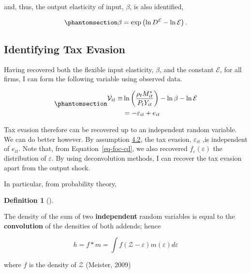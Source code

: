 \documentclass[
  12pt]{article}
\theoremstyle{definition}
\newtheorem{definition}{Definition}[section]
\theoremstyle{remark}
\newenvironment{fbx}[3]{\begin{tcolorbox}[enhanced, breakable,%
attach boxed title to top*={xshift=1.4pt},
boxed title style={boxrule=0.0mm, fuzzy shadow={1pt}{-1pt}{0mm}{0.1mm}{gray}, arc=.3em, rounded corners=east, sharp corners=west}, colframe=#1-color2, colbacktitle=#1-color1, colback = white, coltitle=black,  titlerule=0mm, toprule=0pt, bottomrule=.7pt, leftrule=.3em, rightrule=0pt, outer arc=.3em,  arc=0pt,	 sharp corners = east, left=.5em, bottomtitle=1mm, toptitle=1mm,title=\textbf{#2}\hspace{0.5em}{#3}]}
{\end{tcolorbox}}
\begin{document}
and, thus, the output elasticity of input, \(\beta\), is also
identified,

\begin{equation}\phantomsection\label{eq-id-beta}{
\beta=\exp\left(\ln D^{\mathcal{E}}-\ln\mathcal{E}\right).
}\end{equation}

\subsection{Identifying Tax Evasion}\label{identifying-tax-evasion}

Having recovered both the flexible input elasticity, \(\beta\), and the
constant \(\mathcal{E}\), for all firms, I can form the following
variable using observed data.

\begin{equation}\phantomsection\label{eq-ob-ev}{
\begin{aligned}
    \mathcal V_{it}\equiv&\ln\left(\frac{\rho_t M^*_{it}}{P_{t}Y_{it}}\right)-\ln\beta -\ln\mathcal{E}\notag \\
    &=-\varepsilon_{it} +e_{it}
\end{aligned}
}\end{equation}

Tax evasion therefore can be recovered up to an independent random
variable. We can do better however. By assumption
\hyperref[ass-ind]{4.2}, the tax evasion, \(\varepsilon_{it}\) ,is
independent of \(e_{it}\). Note that, from Equation~\ref{eq-foc-cd}, we
also recovered \(f_{\varepsilon}(\varepsilon)\) the distribution of
\(\varepsilon\). By using deconvolution methods, I can recover the tax
evasion apart from the output shock.

In particular, from probability theory,

\begin{definition}[]\protect\hypertarget{def-conv}{}\label{def-conv}

\begin{fbx}{Definition}{Definition: }{Convolution}
\label{}
The density of the sum of two \textbf{independent} random variables is
equal to the \textbf{convolution} of the densities of both addends;
hence

\[
h = f*m = \int f(\mathcal Z - \varepsilon)m(\varepsilon)d\varepsilon
\]

where \(f\) is the density of \(\mathcal Z\) (Meister, 2009)

\end{fbx}

\end{definition}
\end{document}
